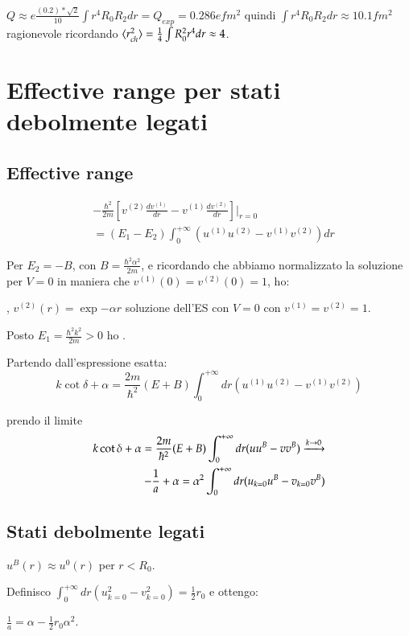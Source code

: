 \documentclass[main.tex]{subfiles}
\begin{document}
$Q\approx e\frac{(0.2)*\sqrt{2}}{10}\int r^4R_0R_2dr=Q_{exp}=0.286 efm^2$ quindi $\int r^4R_0R_2dr\approx10.1 fm^2$ ragionevole ricordando $\langle r_{ch}^2 \rangle=\frac{1}{4}\int R_0^2r^4dr\approx 4$.

\section{Effective range per stati debolmente legati}

\subsection{Effective range}
\begin{align*}
&-\frac{\hbar^2}{2m}[v^{(2)}\frac{dv^{(1)}}{dr}-v^{(1)}\frac{dv^{(2)}}{dr}]|_{r=0}\\
&=(E_1-E_2)\int_0^{+\infty}(u^{(1)}u^{(2)}-v^{(1)}v^{(2)})dr
\end{align*}


Per $E_2=-B$, con $B=\frac{\hbar^2\alpha^2}{2m}$, e ricordando che abbiamo normalizzato la soluzione per $V=0$ in maniera che $v^{(1)}(0)=v^{(2)}(0)=1$, ho:

, $v^{(2)}(r)=\exp{-\alpha r}$ soluzione dell'ES con $V=0$ con $v^{(1)}=v^{(2)}=1$.

Posto $E_1=\frac{\hbar^2k^2}{2m}>0$ ho  .

Partendo dall'espressione esatta:
\begin{equation*}
k\cot{\delta}+\alpha=\frac{2m}{\hbar^2}(E+B)\int_0^{+\infty}dr(u^{(1)}u^{(2)}-v^{(1)}v^{(2)})
\end{equation*}

prendo il limite
\begin{align*}
k\cot{\delta}+\alpha=\frac{2m}{\hbar^2}(E+B)\int_0^{+\infty}dr(uu^B-vv^B)\xrightarrow{k\rightarrow0}\\
-\frac{1}{a}+\alpha=\alpha^2\int_0^{+\infty}dr(u_{k=0}u^B-v_{k=0}v^B)
\end{align*}

\subsection{Stati debolmente legati}
$u^B(r)\approx u^0(r)$ per $r<R_0$.

Definisco $\int_0^{+\infty}dr(u^2_{k=0}-v^2_{k=0})=\frac{1}{2}r_0$ e ottengo:

$\frac{1}{a}=\alpha-\frac{1}{2}r_0\alpha^2$.
\end{document}
